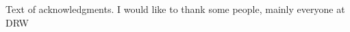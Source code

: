 \begin{acknowledgments}
  Text of acknowledgments. I would like to thank some people, mainly everyone at DRW 
\end{acknowledgments}